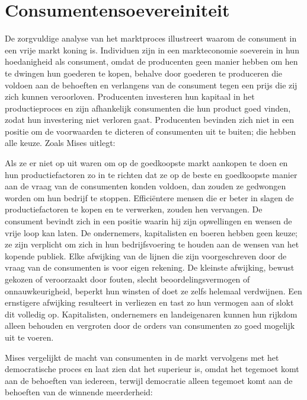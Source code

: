 \hypertarget{consumentensoevereiniteit}{%
\section{Consumentensoevereiniteit}\label{consumentensoevereiniteit}}

De zorgvuldige analyse van het marktproces illustreert waarom de consument in een vrije markt koning is. Individuen zijn in een markteconomie soeverein in hun hoedanigheid als consument, omdat de producenten geen manier hebben om hen te dwingen hun goederen te kopen, behalve door goederen te produceren die voldoen aan de behoeften en verlangens van de consument tegen een prijs die zij zich kunnen veroorloven. Producenten investeren hun kapitaal in het productieproces en zijn afhankelijk consumenten die hun product goed vinden, zodat hun investering niet verloren gaat. Producenten bevinden zich niet in een positie om de voorwaarden te dicteren of consumenten uit te buiten; die hebben alle keuze. Zoals Mises uitlegt:

\begin{blockquotebox}
    Als ze er niet op uit waren om op de goedkoopste markt aankopen te doen en hun productiefactoren zo in te richten dat ze op de beste en goedkoopste manier aan de vraag van de consumenten konden voldoen, dan zouden ze gedwongen worden om hun bedrijf te stoppen. Efficiëntere mensen die er beter in slagen de productiefactoren te kopen en te verwerken, zouden hen vervangen. De consument bevindt zich in een positie waarin hij zijn opwellingen en wensen de vrije loop kan laten. De ondernemers, kapitalisten en boeren hebben geen keuze; ze zijn verplicht om zich in hun bedrijfsvoering te houden aan de wensen van het kopende publiek. Elke afwijking van de lijnen die zijn voorgeschreven door de vraag van de consumenten is voor eigen rekening. De kleinste afwijking, bewust gekozen of veroorzaakt door fouten, slecht beoordelingsvermogen of onnauwkeurigheid, beperkt hun winsten of doet ze zelfs helemaal verdwijnen. Een ernstigere afwijking resulteert in verliezen en tast zo hun vermogen aan of slokt dit volledig op. Kapitalisten, ondernemers en landeigenaren kunnen hun rijkdom alleen behouden en vergroten door de orders van consumenten zo goed mogelijk uit te voeren.\footnotemark    
\end{blockquotebox}

Mises vergelijkt de macht van consumenten in de markt vervolgens met het democratische proces en laat zien dat het superieur is, omdat het tegemoet komt aan de behoeften van iedereen, terwijl democratie alleen tegemoet komt aan de behoeften van de winnende meerderheid:

